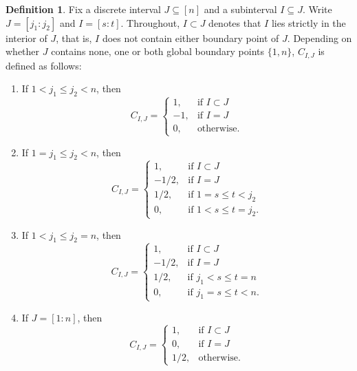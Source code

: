 \documentclass[11pt]{article}
\theoremstyle{plain}
\theoremstyle{definition}
\newtheorem{definition}[theorem]{Definition}
\theoremstyle{remark}
\begin{document}
\begin{definition}\label{defn:C_{IJ}}
    Fix a discrete interval $J \subseteq[n]$ and a subinterval $I \subseteq J$. Write $J= \left[j_1: j_2\right]$ and $I=[s: t]$. Throughout, $I \subset J$ denotes that $I$ lies strictly in the interior of $J$, that is, $I$ does not contain either boundary point of $J$. Depending on whether $J$ contains none, one or both global boundary points $\{1, n\}$, $C_{I,J}$ is defined as follows:
  \begin{enumerate}
    \item If $1 < j_1 \leq j_2 < n$, then
    \[
    C_{I, J} = \begin{cases} 
    1, & \text{if } I \subset J \\ 
    -1, & \text{if } I = J \\ 
    0, & \text{otherwise}.
    \end{cases}
    \]

    \item If $1 = j_1 \leq j_2 < n$, then
    \[
    C_{I, J} = \begin{cases} 
    1, & \text{if } I \subset J \\ 
    -1/2, & \text{if } I = J \\ 
    1/2, & \text{if } 1 = s \leq t < j_2 \\ 
    0, & \text{if } 1 < s \leq t = j_2. 
    \end{cases}
    \]

    \item If $1 < j_1 \leq j_2 = n$, then
    \[
    C_{I, J} = \begin{cases} 
    1, & \text{if } I \subset J \\ 
    -1/2, & \text{if } I = J \\ 
    1/2, & \text{if } j_1 < s \leq t = n \\ 
    0, & \text{if } j_1 = s \leq t < n. 
    \end{cases}
    \]

    \item If $J = [1 : n]$, then
    \[
    C_{I, J} = \begin{cases} 
    1, & \text{if } I \subset J \\ 
    0, & \text{if } I = J \\ 
    1/2, & \text{otherwise}. 
    \end{cases}
    \]
\end{enumerate}
\end{definition}
\end{document}
